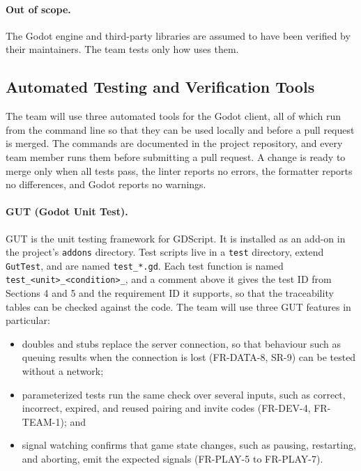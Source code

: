 \documentclass[12pt, titlepage]{article}
\newcommand{\srsref}[1]{#1}
\begin{document}
\paragraph{Out of scope.} The Godot engine and third-party libraries are
assumed to have been verified by their maintainers. The team tests only how
\progname{} uses them.

\subsection{Automated Testing and Verification Tools}
\label{sec:automated-tools} 


The team will use three automated tools for the Godot client, all of which run
from the command line so that they can be used locally and before a pull
request is merged. The commands are documented in the project
repository, and every team member runs them before submitting a pull request.
A change is ready to merge only when all tests pass, the linter reports no
errors, the formatter reports no differences, and Godot reports no warnings.

\paragraph{GUT (Godot Unit Test).} GUT is the unit testing framework for
GDScript. It is installed as an add-on in the project's \texttt{addons}
directory. Test scripts live in a \texttt{test} directory, extend
\texttt{GutTest}, and are named \texttt{test\_*.gd}. Each test function is
named \texttt{test\_<unit>\_<condition>\_<expected result>}, and a comment above
it gives the test ID from Sections 4 and 5 and the requirement ID it supports,
so that the traceability tables can be checked against the code. The team will use three GUT features in particular:
\begin{itemize}
  \item doubles and stubs replace the server connection, so that behaviour such
  as queuing results when the connection is lost (\srsref{FR-DATA-8}, \srsref{SR-9}) can be tested
  without a network;
  \item parameterized tests run the same check over several inputs, such as
  correct, incorrect, expired, and reused pairing and invite codes (\srsref{FR-DEV-4},
  \srsref{FR-TEAM-1}); and
  \item signal watching confirms that game state changes, such as pausing,
  restarting, and aborting, emit the expected signals (\srsref{FR-PLAY-5} to \srsref{FR-PLAY-7}).
\end{itemize}
\end{document}
